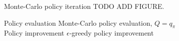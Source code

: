 \bgroup
\begin{frame}{Monte-Carlo policy iteration}
TODO ADD FIGURE.

\textcolor{mImagelabRed}{Policy evaluation} Monte-Carlo policy evaluation, $Q=q_{\pi}$\\
\textcolor{mImagelabRed}{Policy improvement} \textcolor{mImagelabRed}{$\epsilon$}-greedy policy improvement
\end{frame}
\egroup